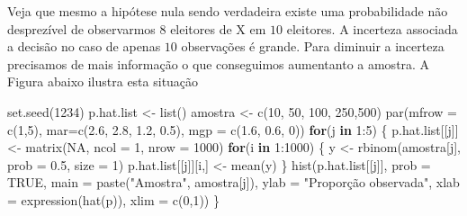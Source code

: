 \documentclass[
  10pt,
  a4paper]{book}
\newenvironment{Shaded}{\begin{snugshade}}{\end{snugshade}}
\newcommand{\AttributeTok}[1]{\textcolor[rgb]{0.77,0.63,0.00}{#1}}
\newcommand{\ConstantTok}[1]{\textcolor[rgb]{0.00,0.00,0.00}{#1}}
\newcommand{\ControlFlowTok}[1]{\textcolor[rgb]{0.13,0.29,0.53}{\textbf{#1}}}
\newcommand{\DecValTok}[1]{\textcolor[rgb]{0.00,0.00,0.81}{#1}}
\newcommand{\FloatTok}[1]{\textcolor[rgb]{0.00,0.00,0.81}{#1}}
\newcommand{\FunctionTok}[1]{\textcolor[rgb]{0.00,0.00,0.00}{#1}}
\newcommand{\NormalTok}[1]{#1}
\newcommand{\OtherTok}[1]{\textcolor[rgb]{0.56,0.35,0.01}{#1}}
\newcommand{\SpecialCharTok}[1]{\textcolor[rgb]{0.00,0.00,0.00}{#1}}
\newcommand{\StringTok}[1]{\textcolor[rgb]{0.31,0.60,0.02}{#1}}
\begin{document}
Veja que mesmo a hipótese nula sendo verdadeira existe uma probabilidade
não desprezível de observarmos \(8\) eleitores de X em \(10\) eleitores.
A incerteza associada a decisão no caso de apenas \(10\) observações é
grande. Para diminuir a incerteza precisamos de mais informação o que conseguimos aumentanto a amostra. A Figura abaixo ilustra esta situação

\begin{Shaded}
\begin{Highlighting}[]
\FunctionTok{set.seed}\NormalTok{(}\DecValTok{1234}\NormalTok{)}
\NormalTok{p.hat.list }\OtherTok{\textless{}{-}} \FunctionTok{list}\NormalTok{()}
\NormalTok{amostra }\OtherTok{\textless{}{-}} \FunctionTok{c}\NormalTok{(}\DecValTok{10}\NormalTok{, }\DecValTok{50}\NormalTok{, }\DecValTok{100}\NormalTok{, }\DecValTok{250}\NormalTok{,}\DecValTok{500}\NormalTok{)}
\FunctionTok{par}\NormalTok{(}\AttributeTok{mfrow =} \FunctionTok{c}\NormalTok{(}\DecValTok{1}\NormalTok{,}\DecValTok{5}\NormalTok{), }\AttributeTok{mar=}\FunctionTok{c}\NormalTok{(}\FloatTok{2.6}\NormalTok{, }\FloatTok{2.8}\NormalTok{, }\FloatTok{1.2}\NormalTok{, }\FloatTok{0.5}\NormalTok{), }\AttributeTok{mgp =} \FunctionTok{c}\NormalTok{(}\FloatTok{1.6}\NormalTok{, }\FloatTok{0.6}\NormalTok{, }\DecValTok{0}\NormalTok{))}
\ControlFlowTok{for}\NormalTok{(j }\ControlFlowTok{in} \DecValTok{1}\SpecialCharTok{:}\DecValTok{5}\NormalTok{) \{}
\NormalTok{  p.hat.list[[j]] }\OtherTok{\textless{}{-}} \FunctionTok{matrix}\NormalTok{(}\ConstantTok{NA}\NormalTok{, }\AttributeTok{ncol =} \DecValTok{1}\NormalTok{, }\AttributeTok{nrow =} \DecValTok{1000}\NormalTok{)}
  \ControlFlowTok{for}\NormalTok{(i }\ControlFlowTok{in} \DecValTok{1}\SpecialCharTok{:}\DecValTok{1000}\NormalTok{) \{}
\NormalTok{  y }\OtherTok{\textless{}{-}} \FunctionTok{rbinom}\NormalTok{(amostra[j], }\AttributeTok{prob =} \FloatTok{0.5}\NormalTok{, }\AttributeTok{size =} \DecValTok{1}\NormalTok{)}
\NormalTok{  p.hat.list[[j]][i,] }\OtherTok{\textless{}{-}} \FunctionTok{mean}\NormalTok{(y)}
\NormalTok{  \}}
\FunctionTok{hist}\NormalTok{(p.hat.list[[j]], }\AttributeTok{prob =} \ConstantTok{TRUE}\NormalTok{, }\AttributeTok{main =} \FunctionTok{paste}\NormalTok{(}\StringTok{"Amostra"}\NormalTok{, amostra[j]), }
     \AttributeTok{ylab =} \StringTok{"Proporção observada"}\NormalTok{,}
     \AttributeTok{xlab =} \FunctionTok{expression}\NormalTok{(}\FunctionTok{hat}\NormalTok{(p)), }\AttributeTok{xlim =} \FunctionTok{c}\NormalTok{(}\DecValTok{0}\NormalTok{,}\DecValTok{1}\NormalTok{))}
\NormalTok{\}}
\end{Highlighting}
\end{Shaded}
\end{document}

